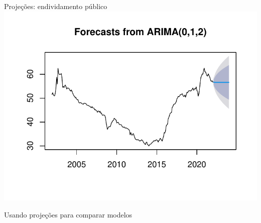 \documentclass[11pt]{beamer}
\begin{document}
\begin{frame}{Projeções: endividamento público}\centering
\includegraphics[scale=0.9]{graficos/divida_forecast_plot.pdf}
\end{frame}

\begin{frame}{Usando projeções para comparar modelos}

\end{frame}
\end{document}
